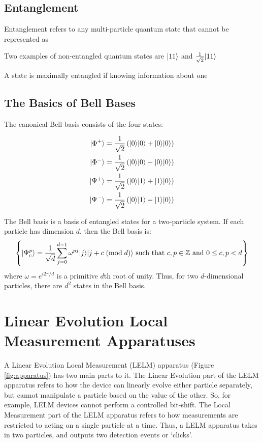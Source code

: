 \subsection{Entanglement}

Entanglement refers to any multi-particle quantum state that cannot be represented as 

Two examples of non-entangled quantum states are $| 11 \rangle$ and $\frac{1}{\sqrt{2}}| 11 \rangle$


A state is maximally entangled if knowing information about one 




\subsection{The Basics of Bell Bases}

The canonical Bell basis consists of the four states:

\begin{align*}
	| \Phi^+ \rangle &= \frac{1}{\sqrt{2}} \left(| 0 \rangle| 0 \rangle + | 0 \rangle| 0 \rangle\right) \\
	| \Phi^- \rangle &= \frac{1}{\sqrt{2}} \left(| 0 \rangle| 0 \rangle - | 0 \rangle| 0 \rangle\right) \\
	| \Psi^+ \rangle &= \frac{1}{\sqrt{2}} \left(| 0 \rangle| 1 \rangle + | 1 \rangle| 0 \rangle\right) \\
	| \Psi^- \rangle &= \frac{1}{\sqrt{2}} \left(| 0 \rangle| 1 \rangle - | 1 \rangle| 0 \rangle\right)
\end{align*}

The Bell basis is a basis of entangled states for a two-particle system. If each particle has dimension $d$, then the Bell basis is:
\[
\left\{ | \Psi_c^p \rangle = \frac{1}{\sqrt{d}} \sum_{j=0}^{d-1} \omega^{pj} | j \rangle| j + c \;(\text{mod}\; d) \rangle \text{ such that } c, p \in \mathbb{Z} \text{ and } 0 \leq c,p < d \right\}
\]
where $\omega = e^{i 2 \pi / d}$ is a primitive $d$th root of unity. Thus, for two $d$-dimensional particles, there are $d^2$ states in the Bell basis.

\section{Linear Evolution Local Measurement Apparatuses}

A Linear Evolution Local Measurement (LELM) apparatus (Figure \ref{fig:apparatus}) has two main parts to it. The Linear Evolution part of the LELM apparatus refers to how the device can linearly evolve either particle separately, but cannot manipulate a particle based on the value of the other. So, for example, LELM devices cannot perform a controlled bit-shift. The Local Measurement part of the LELM apparatus refers to how measurements are restricted to acting on a single particle at a time. Thus, a LELM apparatus takes in two particles, and outputs two detection events or `clicks'.

